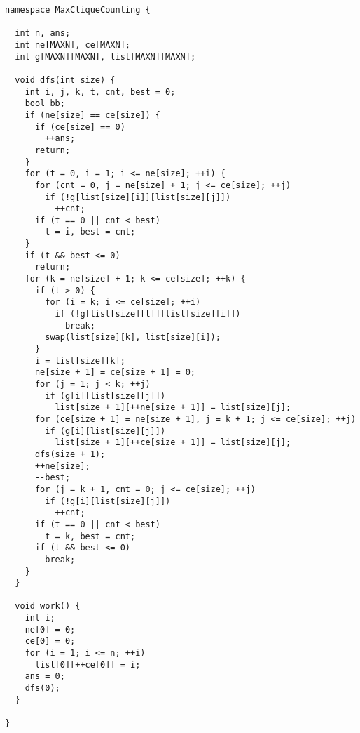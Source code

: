 \begin{lstlisting}
namespace MaxCliqueCounting {

  int n, ans;
  int ne[MAXN], ce[MAXN];
  int g[MAXN][MAXN], list[MAXN][MAXN];

  void dfs(int size) {
    int i, j, k, t, cnt, best = 0;
    bool bb;
    if (ne[size] == ce[size]) {
      if (ce[size] == 0)
        ++ans;
      return;
    }
    for (t = 0, i = 1; i <= ne[size]; ++i) {
      for (cnt = 0, j = ne[size] + 1; j <= ce[size]; ++j)
        if (!g[list[size][i]][list[size][j]])
          ++cnt;
      if (t == 0 || cnt < best)
        t = i, best = cnt;
    }
    if (t && best <= 0)
      return;
    for (k = ne[size] + 1; k <= ce[size]; ++k) {
      if (t > 0) {
        for (i = k; i <= ce[size]; ++i)
          if (!g[list[size][t]][list[size][i]])
            break;
        swap(list[size][k], list[size][i]);
      }
      i = list[size][k];
      ne[size + 1] = ce[size + 1] = 0;
      for (j = 1; j < k; ++j)
        if (g[i][list[size][j]])
          list[size + 1][++ne[size + 1]] = list[size][j];
      for (ce[size + 1] = ne[size + 1], j = k + 1; j <= ce[size]; ++j)
        if (g[i][list[size][j]])
          list[size + 1][++ce[size + 1]] = list[size][j];
      dfs(size + 1);
      ++ne[size];
      --best;
      for (j = k + 1, cnt = 0; j <= ce[size]; ++j)
        if (!g[i][list[size][j]])
          ++cnt;
      if (t == 0 || cnt < best)
        t = k, best = cnt;
      if (t && best <= 0)
        break;
    }
  }

  void work() {
    int i;
    ne[0] = 0;
    ce[0] = 0;
    for (i = 1; i <= n; ++i)
      list[0][++ce[0]] = i;
    ans = 0;
    dfs(0);
  }

}

\end{lstlisting}